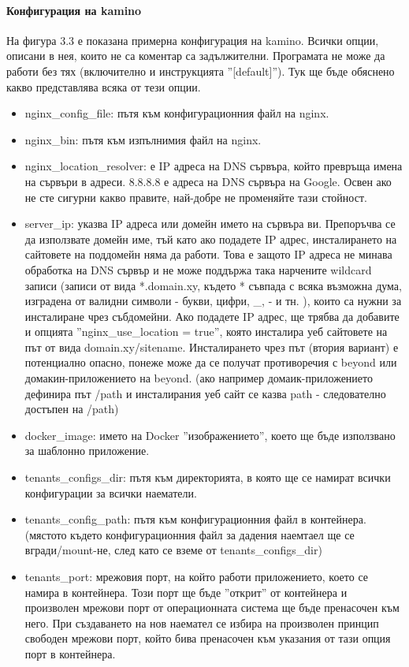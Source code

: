 \documentclass[pdftex,14pt,a4paper]{extreport}
\begin{document}
\paragraph {Конфигурация на kamino\\}
На фигура 3.3 е показана примерна конфигурация на kamino. Всички опции, описани в нея, които не са коментар са задължителни. Програмата не може да работи без тях (включително и инструкцията ''[default]''). Тук ще бъде обяснено какво представлява всяка от тези опции.
\begin{itemize}
  \item nginx\_config\_file: пътя към конфигурационния файл на nginx.
  \item nginx\_bin:  пътя към изпълнимия файл на nginx.
  \item nginx\_location\_resolver: е IP адреса на DNS сървъра, който превръща имена на сървъри в адреси. 8.8.8.8 е адреса на DNS сървъра на Google. Освен ако не сте сигурни какво правите, най-добре не променяйте тази стойност.
  \item server\_ip: указва IP адреса или домейн името на сървъра ви. Препоръчва се да използвате домейн име, тъй като ако подадете IP адрес, инсталирането на сайтовете на поддомейн няма да работи. Това е защото IP адреса не минава обработка на DNS сървър и не може поддържа така нарчените wildcard записи (записи от вида *.domain.xy, където * съвпада с всяка възможна дума, изградена от валидни символи - букви, цифри, \_, - и тн. ), които са нужни за инсталиране чрез събдомейни.  Ако подадете IP адрес, ще трябва да добавите и опцията ''nginx\_use\_location = true'', която инсталира уеб сайтовете на път от вида domain.xy/sitename. Инсталирането чрез път (втория вариант) е потенциално опасно, понеже може да се получат противоречия с beyond или домакин-приложението на beyond. (ако например домаик-приложението дефинира път /path и инсталирания уеб сайт се казва path - следователно достъпен на /path)
  \item docker\_image: името на Docker ''изображението'', което ще бъде използвано за шаблонно приложение.
  \item tenants\_configs\_dir: пътя към директорията, в която ще се намират всички конфигурации за всички наематели.
  \item tenants\_config\_path: пътя към конфигурационния файл в контейнера. (мястото където конфигурационния файл за дадения наемтаел ще се вгради/mount-не, след като се вземе от tenants\_configs\_dir)
  \item tenants\_port: мрежовия порт, на който работи приложението, което се намира в контейнера. Този порт ще бъде ''открит'' от контейнера и произволен мрежови порт от операционната система ще бъде пренасочен към него. При създаването на нов наемател се избира на произволен принцип свободен мрежови порт, който бива пренасочен към указания от тази опция порт в контейнера.

\end{itemize}
\end{document}
